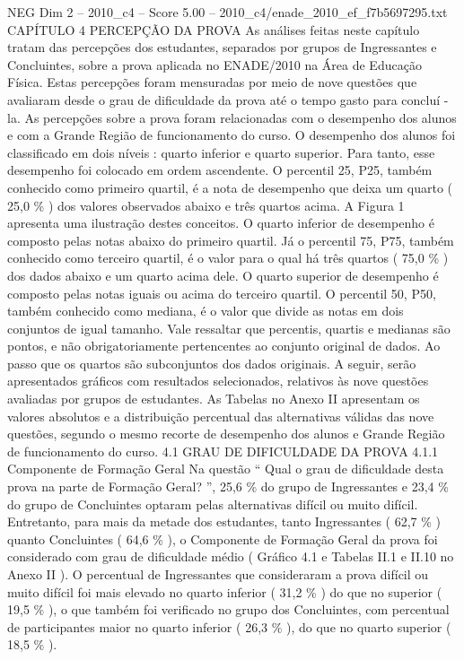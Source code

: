 \begin{textsample}{NEG Dim 2 – 2010\_c4 – Score 5.00 – 2010\_c4/enade\_2010\_ef\_f7b5697295.txt}  \label{ex:f2_neg_288}
CAPÍTULO 4 PERCEPÇÃO DA PROVA As análises feitas neste capítulo tratam das percepções dos estudantes, separados por grupos de Ingressantes e Concluintes, sobre a prova aplicada no ENADE/2010 na Área de Educação Física.
Estas percepções foram mensuradas por meio de nove questões que avaliaram desde o grau de dificuldade da prova até o tempo gasto para concluí -la.
As percepções sobre a prova foram relacionadas com o desempenho dos alunos e com a Grande Região de funcionamento do curso.
O desempenho dos alunos foi classificado em dois níveis : quarto inferior e quarto superior.
Para tanto, esse desempenho foi colocado em ordem ascendente.
O percentil 25, P25, também conhecido como primeiro quartil, é a nota de desempenho que deixa um quarto ( 25,0 \% ) dos valores observados abaixo e três quartos acima.
A Figura 1 apresenta uma ilustração destes conceitos.
O quarto inferior de desempenho é composto pelas notas abaixo do primeiro quartil.
Já o percentil 75, P75, também conhecido como terceiro quartil, é o valor para o qual há três quartos ( 75,0 \% ) dos dados abaixo e um quarto acima dele.
O quarto superior de desempenho é composto pelas notas iguais ou acima do terceiro quartil.
O percentil 50, P50, também conhecido como mediana, é o valor que divide as notas em dois conjuntos de igual tamanho.
Vale ressaltar que percentis, quartis e medianas são pontos, e não obrigatoriamente pertencentes ao conjunto original de dados.
Ao passo que os quartos são subconjuntos dos dados originais.
A seguir, serão apresentados gráficos com resultados selecionados, relativos às nove questões avaliadas por grupos de estudantes.
As Tabelas no Anexo II apresentam os valores absolutos e a distribuição percentual das alternativas válidas das nove questões, segundo o mesmo recorte de desempenho dos alunos e Grande Região de funcionamento do curso. 4.1 GRAU DE DIFICULDADE DA PROVA 4.1.1 Componente de Formação Geral Na questão “ Qual o grau de dificuldade desta prova na parte de Formação Geral? ”, 25,6 \% do grupo de Ingressantes e 23,4 \% do grupo de Concluintes optaram pelas alternativas difícil ou muito difícil.
Entretanto, para mais da metade dos estudantes, tanto Ingressantes ( 62,7 \% ) quanto Concluintes ( 64,6 \% ), o Componente de Formação Geral da prova foi considerado com grau de dificuldade médio ( Gráfico 4.1 e Tabelas II.1 e II.10 no Anexo II ).
O percentual de Ingressantes que consideraram a prova difícil ou muito difícil foi mais elevado no quarto inferior ( 31,2 \% ) do que no superior ( 19,5 \% ), o que também foi verificado no grupo dos Concluintes, com percentual de participantes maior no quarto inferior ( 26,3 \% ), do que no quarto superior ( 18,5 \% ).

\end{textsample}
